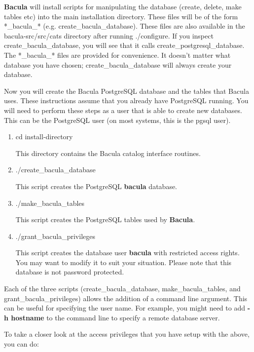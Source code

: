 {{{{{\bf Bacula} will install scripts for manipulating the database (create,
delete, make tables etc) into the main installation directory. These files
will be of the form *\_bacula\_* (e.g. create\_bacula\_database). These files
are also available in the \lt{}bacula-src\gt{}/src/cats directory after
running ./configure. If you inspect create\_bacula\_database, you will see
that it calls create\_postgresql\_database. The *\_bacula\_* files are
provided for convenience. It doesn't matter what database you have chosen;
create\_bacula\_database will always create your database. 

Now you will create the Bacula PostgreSQL database and the tables that Bacula
uses. These instructions assume that you already have PostgreSQL running. You
will need to perform these steps as a user that is able to create new
databases. This can be the PostgreSQL user (on most systems, this is the pgsql
user). 

\begin{enumerate}
\item cd \lt{}install-directory\gt{}

   This directory contains the Bacula catalog  interface routines.  

\item ./create\_bacula\_database

   This script creates the PostgreSQL {\bf bacula} database.  

\item ./make\_bacula\_tables

   This script creates the PostgreSQL tables used by {\bf Bacula}.  
\item ./grant\_bacula\_privileges

   This script creates the database user {\bf bacula}  with restricted access
rights. You may  want to modify it to suit your situation. Please note that 
this database is not password protected.  

\end{enumerate}

Each of the three scripts (create\_bacula\_database, make\_bacula\_tables, and
grant\_bacula\_privileges) allows the addition of a command line argument.
This can be useful for specifying the user name. For example, you might need
to add {\bf -h hostname} to the command line to specify a remote database
server. 

To take a closer look at the access privileges that you have setup with the
above, you can do: 

}}}}
